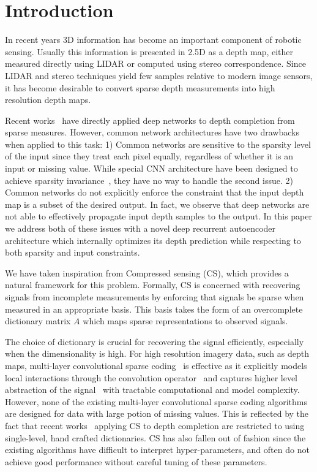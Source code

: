 \section{Introduction}
In recent years 3D information has become an important component of robotic sensing. Usually this information is presented in 2.5D as a depth map, either measured directly using LIDAR or computed using stereo correspondence. Since LIDAR and stereo techniques yield few samples relative to modern image sensors, it has become desirable to convert sparse depth measurements into high resolution depth maps.


Recent works~\cite{} have directly applied deep networks to depth completion from sparse measures. However, common network architectures have two drawbacks when applied to this task: 1) Common networks are sensitive to the sparsity level of the input since they treat each pixel equally, regardless of whether it is an input or missing value. While special CNN architecture have been designed to achieve sparsity invariance~\cite{}, they have no way to handle the second issue. 2) Common networks do not explicitly enforce the constraint that the input depth map is a subset of the desired output. In fact, we observe that deep networks are not able to effectively propagate input depth samples to the output. In this paper we address both of these issues with a novel deep recurrent autoencoder architecture which internally optimizes its depth prediction while respecting to both sparsity and input constraints.


We have taken inspiration from Compressed sensing (CS), which provides a natural framework for this problem. Formally, CS is concerned with recovering signals from incomplete measurements by enforcing that signals be sparse when measured in an appropriate basis. This basis takes the form of an overcomplete dictionary matrix $A$ which maps sparse representations to observed signals.
  
The choice of dictionary is crucial for recovering the signal efficiently, especially when the dimensionality is high. For high resolution imagery data, such as depth maps, multi-layer convolutional sparse coding~\cite{} is effective as it explicitly models local interactions through the convolution operator~\cite{} and captures higher level abstraction of the signal~\cite{} with tractable computational and model complexity. However, none of the existing multi-layer convolutional sparse coding algorithms are designed for data with large potion of missing values. This is reflected by the fact that recent works~\cite{} applying CS to depth completion are restricted to using single-level, hand crafted dictionaries. CS has also fallen out of fashion since the existing algorithms have difficult to interpret hyper-parameters, and often do not achieve good performance without careful tuning of these parameters.
  
